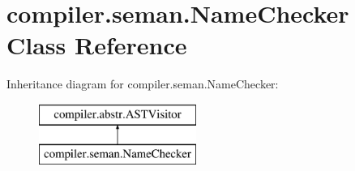 \hypertarget{classcompiler_1_1seman_1_1_name_checker}{}\section{compiler.\+seman.\+Name\+Checker Class Reference}
\label{classcompiler_1_1seman_1_1_name_checker}
Inheritance diagram for compiler.\+seman.\+Name\+Checker\+:\begin{figure}[H]
\begin{center}
\leavevmode
\includegraphics[height=2.000000cm]{classcompiler_1_1seman_1_1_name_checker}
\end{center}
\end{figure}
